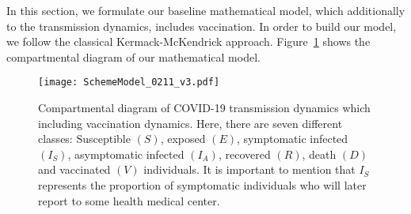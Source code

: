  In this section, we formulate our baseline mathematical model, which
additionally to the transmission dynamics, includes vaccination. In
order to
build our model, we follow the classical Kermack-McKendrick approach.
Figure~\ref{Fig:SchemeModel} shows the compartmental diagram of our
mathematical model.
\begin{figure}[h!]
    \centering
    \texttt{[image: SchemeModel\_0211\_v3.pdf]}
    \caption{Compartmental diagram of COVID-19 transmission dynamics
    which
  including vaccination dynamics. Here, there are seven different
  classes:
        Susceptible $(S)$, exposed $(E)$, symptomatic infected
        $(I_S)$,
        asymptomatic infected $(I_A)$, recovered $(R)$, death $(D)$
        and
      vaccinated $(V)$ individuals. It is important to mention that
      $I_{S}$
      represents the proportion of symptomatic individuals who will
      later
      report to some health medical center.}
  \label{Fig:SchemeModel}
\end{figure}


